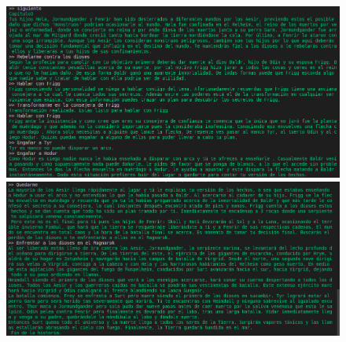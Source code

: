 \documentclass[12pt]{article}
\begin{document}
\begin{figure}[h]
	\begin{center}
		\includegraphics[width =15.0cm]{./img/Historia3.png}
		\includegraphics[width =15.0cm]{./img/Historia4.png}
	\end{center}
\end{figure}
\end{document}
